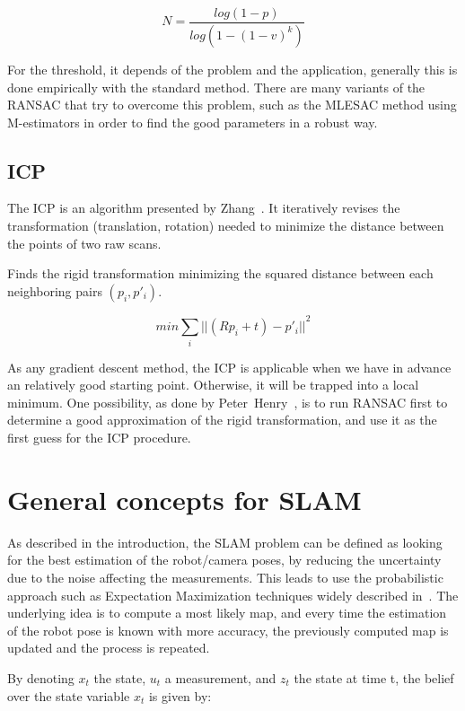 \[
N = \frac{log(1-p)}{log(1-(1-v)^k)}
\]

For the threshold, it depends of the problem and the application, generally this is done empirically with the standard method. There are many variants of the \gls{RANSAC} that try to overcome this problem, such as the MLESAC method \cite{TorrZ00} using M-estimators in order to find the good parameters in a robust way.


\subsection{ICP}

The \gls{ICP} is an algorithm presented by Zhang~\cite{zhang_92_icp}.
It iteratively revises the transformation (translation, rotation) needed to minimize the distance between the points of two raw scans.

Finds the rigid transformation minimizing the squared distance between each neighboring pairs $(p_{i}, p'_{i})$.

\[min \sum_{i}{||(Rp_{i}+t)-p'_{i}||}^2\]


As any gradient descent method, the \gls{ICP} is applicable when we have in advance an relatively good starting point. Otherwise, it will be trapped into a local minimum. One possibility, as done by Peter~Henry~\cite{Intel_RGBD_2010}, is to run \gls{RANSAC} first to determine a good approximation of the rigid transformation, and use it as the first guess for the \gls{ICP} procedure.

\section{General concepts for SLAM}

As described in the introduction, the \gls{SLAM} problem can be defined as looking for the best estimation of the robot/camera poses, by reducing the uncertainty due to the noise affecting the measurements. This leads to use the probabilistic approach such as Expectation Maximization techniques widely described in~\cite{Thrun_2005}. The underlying idea is to compute a most likely map, and every time the estimation of the robot pose is known with more accuracy, the previously computed map is updated and the process is repeated.

By denoting $x_t$ the state, $u_t$ a measurement, and $z_t$ the state at time t, the belief over the state variable $x_t$ is given by:

